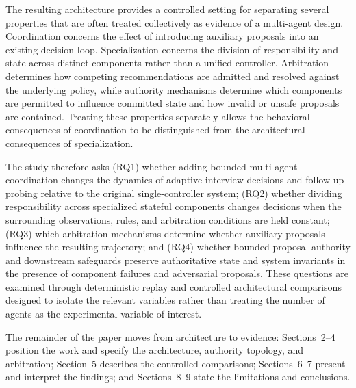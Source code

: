 The resulting architecture provides a controlled setting for separating several properties that are often treated collectively as evidence of a multi-agent design. Coordination concerns the effect of introducing auxiliary proposals into an existing decision loop. Specialization concerns the division of responsibility and state across distinct components rather than a unified controller. Arbitration determines how competing recommendations are admitted and resolved against the underlying policy, while authority mechanisms determine which components are permitted to influence committed state and how invalid or unsafe proposals are contained. Treating these properties separately allows the behavioral consequences of coordination to be distinguished from the architectural consequences of specialization.

The study therefore asks (RQ1) whether adding bounded multi-agent coordination changes the dynamics of adaptive interview decisions and follow-up probing relative to the original single-controller system; (RQ2) whether dividing responsibility across specialized stateful components changes decisions when the surrounding observations, rules, and arbitration conditions are held constant; (RQ3) which arbitration mechanisms determine whether auxiliary proposals influence the resulting trajectory; and (RQ4) whether bounded proposal authority and downstream safeguards preserve authoritative state and system invariants in the presence of component failures and adversarial proposals. These questions are examined through deterministic replay and controlled architectural comparisons designed to isolate the relevant variables rather than treating the number of agents as the experimental variable of interest.

The remainder of the paper moves from architecture to evidence: Sections~2--4 position the work and specify the architecture, authority topology, and arbitration; Section~5 describes the controlled comparisons; Sections~6--7 present and interpret the findings; and Sections~8--9 state the limitations and conclusions.
